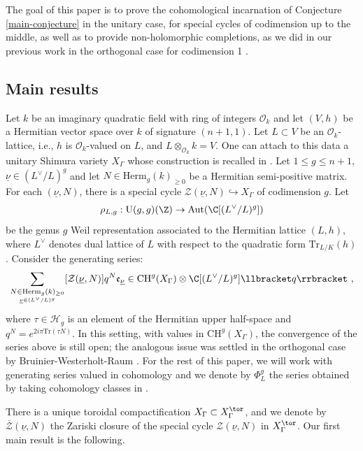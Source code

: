 \documentclass[11pt,letterpaper,english]{amsart}
\numberwithin{equation}{subsection}
\numberwithin{equation}{section}
\newcommand\cH{{\mathcal H}}
\newcommand\cZ{{\mathcal Z}}
\newcommand{\trace}{\mathrm{Tr}}
\theoremstyle{plain}
\theoremstyle{remark}
\begin{document}
The goal of this paper is to prove the cohomological incarnation of Conjecture \ref{main-conjecture} in the unitary case, for special cycles of codimension up to the middle, as well as to provide non-holomorphic completions, as we did in our previous work in the orthogonal case for codimension 1 \cite{engel-greer-tayou}. 

\subsection{Main results}

Let $k$ be an imaginary quadratic field with ring of integers $\mathcal{O}_k$ and let $(V,h)$ be a Hermitian vector space over $k$ of signature $(n+1,1)$. Let $L\subset V$ be an $\mathcal{O}_k$-lattice, i.e., $h$ is $\mathcal{O}_k$-valued on $L$, and $L\otimes_{\mathcal{O}_k}k=V$.  One can attach to this data a unitary Shimura variety $X_\Gamma$ whose construction is recalled in . Let $1\leq g\leq n+1$, $\underline\nu\in (L^\vee/L)^{g}$  and let $N\in\mathrm{Herm}_{g}(k)_{\geq 0}$ be a Hermitian semi-positive matrix. For each $(\underline{\nu},N)$, there is a special cycle $\cZ(\underline{\nu},N)\hookrightarrow X_\Gamma$ of codimension $g$. Let
\[\rho_{L,g}: \mathrm{U}(g,g)(\Z) \rightarrow \mathrm{Aut}(\C[(L^\vee/L)^g]) \]
be the genus $g$ Weil representation associated to the Hermitian lattice $(L,h)$, where $L^\vee$ denotes dual lattice of $L$ with respect to the quadratic form $\trace_{L/K}(h)$. Consider the generating series:
\begin{align}\label{gen-series-chow}
\sum_{\underset{\underline{\nu}\in (L^\vee/L)^g}{N\in \mathrm{Herm}_{g}(k)_{\geq 0}}} [\cZ(\underline{\nu},N)]q^N \mathfrak{e}_{\underline\nu}\in \mathrm{CH}^g(X_\Gamma)\otimes \C[(L^\vee/L)^g] \llbracket q \rrbracket~,
\end{align}
where $\tau\in \cH_g$ is an element of the Hermitian upper half-space and $q^N=e^{2i\pi \trace(\tau N  )}$. In this setting, with values in $\mathrm{CH}^g(X_\Gamma)$, the convergence of the series above is still open; the analogous issue was settled in the orthogonal case by Bruinier-Westerholt-Raum \cite{Bruinier-Westerholt-Raum}. For the rest of this paper, we will work with generating series valued in cohomology and we denote by $\Phi_L^g$ the series obtained by taking cohomology classes in .
\medskip

There is a unique toroidal compactification $X_\Gamma \subset X_\Gamma^\tor$, and we denote by $\overline{\cZ}(\underline{\nu},N)$ the Zariski closure of the special cycle $\cZ(\underline{\nu},N)$ in $X^\tor_\Gamma$. Our first main result is the following.
\end{document}
